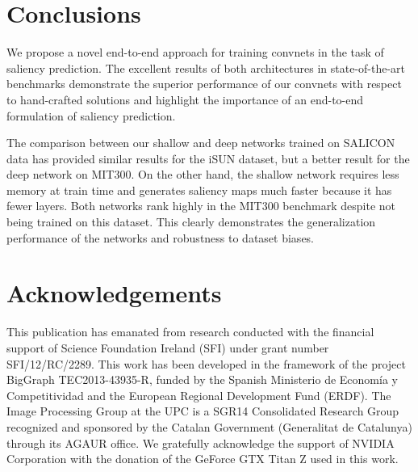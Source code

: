 \documentclass[10pt,twocolumn,letterpaper]{article}
\begin{document}
\section{Conclusions}\label{sec:conclusions}

We propose a novel end-to-end approach for training convnets in the task of saliency prediction.
The excellent results of both architectures in state-of-the-art benchmarks demonstrate the superior performance of our convnets with respect to hand-crafted solutions and highlight the importance of an end-to-end formulation of saliency prediction.%

The comparison between our shallow and deep networks trained on SALICON data has provided similar results for the iSUN dataset, but a better result for the deep network on MIT300.
On the other hand, the shallow network requires less memory at train time and generates saliency maps much faster because it has fewer layers. %
Both networks rank highly in the MIT300 benchmark despite not being trained on this dataset.
This clearly demonstrates the generalization performance of the networks and robustness to dataset biases.

\section*{Acknowledgements}\label{sec:acknowledgements}

This publication has emanated from research conducted with the financial support of Science Foundation Ireland (SFI) under grant number SFI/12/RC/2289.
This work has been developed in the framework of the project BigGraph TEC2013-43935-R, funded by the Spanish Ministerio de Econom\'ia y Competitividad and the European Regional Development Fund (ERDF). 
The Image Processing Group at the UPC is a SGR14 Consolidated Research Group recognized and sponsored by the Catalan Government (Generalitat de Catalunya) through its  AGAUR office.
We gratefully acknowledge the support of NVIDIA Corporation with the donation of the GeForce GTX Titan Z used in this work.

{\small


}
\end{document}
